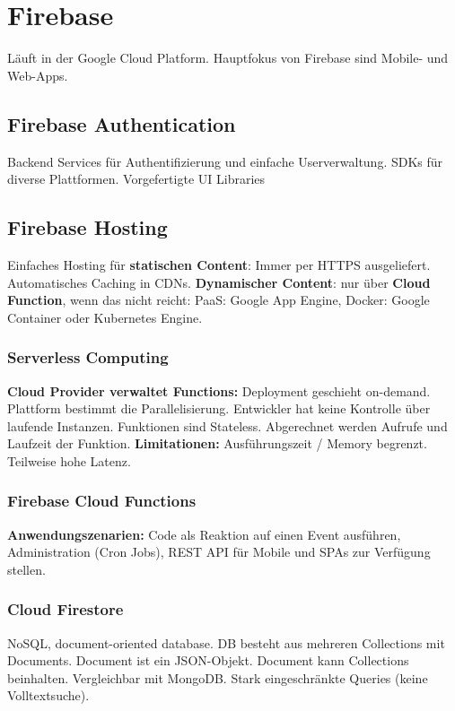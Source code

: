 
\section{Firebase}
Läuft in der Google Cloud Platform.
Hauptfokus von Firebase sind Mobile- und Web-Apps.

\subsection{Firebase Authentication}
Backend Services für Authentifizierung und einfache Userverwaltung.
SDKs für diverse Plattformen.
Vorgefertigte UI Libraries

\subsection{Firebase Hosting}
Einfaches Hosting für \textbf{statischen Content}:
Immer per HTTPS ausgeliefert.
Automatisches Caching in CDNs.
\textbf{Dynamischer Content}: nur über \textbf{Cloud Function}, wenn das nicht reicht:
PaaS: Google App Engine,
Docker: Google Container oder Kubernetes Engine.

\subsubsection{Serverless Computing}
\textbf{Cloud Provider verwaltet Functions:}
Deployment geschieht on-demand.
Plattform bestimmt die Parallelisierung.
Entwickler hat keine Kontrolle über laufende Instanzen.
Funktionen sind Stateless.
Abgerechnet werden Aufrufe und Laufzeit der Funktion.
\textbf{Limitationen:} Ausführungszeit / Memory begrenzt.
Teilweise hohe Latenz.

\subsubsection{Firebase Cloud Functions}
\textbf{Anwendungszenarien:} Code als Reaktion auf einen Event ausführen,
Administration (Cron Jobs), REST API für Mobile und SPAs zur Verfügung stellen.

\subsubsection{Cloud Firestore}
NoSQL, document-oriented database.
DB besteht aus mehreren Collections mit Documents.
Document ist ein JSON-Objekt.
Document kann Collections beinhalten.
Vergleichbar mit MongoDB.
Stark eingeschränkte Queries (keine Volltextsuche).

